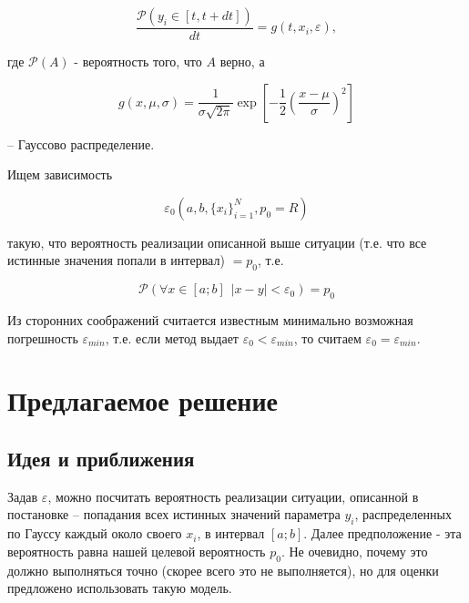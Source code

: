 \documentclass[a4paper,12pt]{article} %
\begin{document}
\begin{equation}
\dfrac{\mathcal{P}(y_i \in [t, t+dt])}{dt} = g(t, x_i, \varepsilon), 
\end{equation}

где $\mathcal{P}(A)$ - вероятность того, что $A$ верно, а

\begin{equation}
g(x, \mu, \sigma) = \dfrac{1}{\sigma \sqrt{2 \pi}} \exp{\left[ - \dfrac{1}{2} \left( \dfrac{x - \mu}{\sigma} \right)^2 \right]}
\end{equation}

-- Гауссово распределение.

Ищем зависимость

\begin{equation}
\varepsilon_0 \left( a, b, \{x_i\}_{i = 1}^{N}, p_0 = R \right)
\end{equation}

такую, что вероятность реализации описанной выше ситуации (т.е. что все истинные значения попали в интервал) $ = p_0$, т.е.

\begin{equation}
\mathcal{P}(\forall x \in [a;b] \hspace{5pt} |x - y| < \varepsilon_0) = p_0
\end{equation}

Из сторонних соображений считается известным минимально возможная погрешность $\varepsilon_{min}$, т.е. если метод выдает $\varepsilon_0 < \varepsilon_{min}$, то считаем $\varepsilon_0 = \varepsilon_{min}$.

\newpage

\section{Предлагаемое решение}

\subsection{Идея и приближения}

Задав $\varepsilon$, можно посчитать вероятность реализации ситуации, описанной в постановке -- попадания всех истинных значений параметра $y_i$, распределенных по Гауссу каждый около своего $x_i$, в интервал $[a;b]$. Далее предположение - эта вероятность равна нашей целевой вероятность $p_0$. Не очевидно, почему это должно выполняться точно (скорее всего это не выполняется), но для оценки предложено использовать такую модель. 
\end{document}
